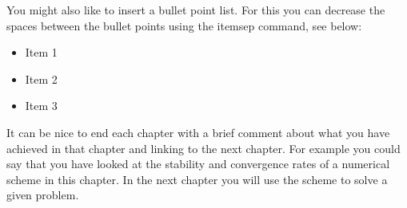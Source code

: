 You might also like to insert a bullet point list. For this you can decrease the spaces between the bullet points using the itemsep command, see below:
\begin{itemize}
\setlength\itemsep{0em}
\item Item 1
\item Item 2
\item Item 3
\end{itemize}

It can be nice to end each chapter with a brief comment about what you have achieved in that chapter and linking to the next chapter. For example you could say that you have looked at the stability and convergence rates of a numerical scheme in this chapter. In the next chapter you will use the scheme to solve a given problem.